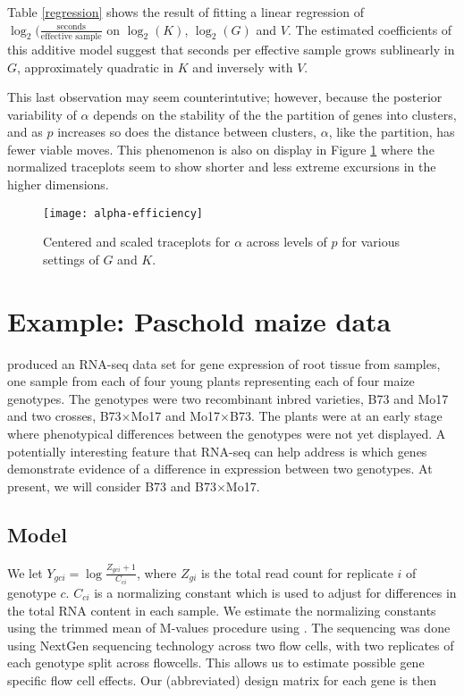 Table \ref{regression} shows the result of fitting a linear regression of $\log_2(\frac{\mbox{seconds}}{\mbox{effective sample}}$ on $\log_2(K)$, $\log_2(G)$ and $V$. The estimated coefficients of this additive model suggest that seconds per effective sample grows sublinearly in $G$, approximately quadratic in $K$ and inversely with $V$.

This last observation may seem counterintutive; however, because the posterior variability of $\alpha$ depends on the stability of the the partition of genes into clusters, and as $p$ increases so does the distance between clusters, $\alpha$, like the partition, has fewer viable moves. This phenomenon is also on display in Figure \ref{alpha-trace} where the normalized traceplots seem to show shorter and less extreme excursions in the higher dimensions.

\begin{figure}
\centering
\texttt{[image: alpha-efficiency]}
\caption{Centered and scaled traceplots for $\alpha$ across levels of $p$ for various settings of $G$ and $K$.}
\label{alpha-trace}
\end{figure}

\section{Example: Paschold maize data}
\citet{paschold} produced an RNA-seq data set for gene expression of root tissue from samples, one sample from each of four young plants representing each of four maize genotypes. The genotypes were two recombinant inbred varieties, B73 and Mo17 and two crosses, B73$\times$Mo17 and Mo17$\times$B73. The plants were at an early stage where phenotypical differences between the genotypes were not yet displayed. A potentially interesting feature that RNA-seq can help address is which genes demonstrate evidence of a difference in expression between two genotypes. At present, we will consider B73 and B73$\times$Mo17.

\subsection{Model}
We let $Y_{gci} = \log \frac{Z_{gci}+1}{C_{ci}}$, where $Z_{gi}$ is the total read count for replicate $i$ of genotype $c$. $C_{ci}$ is a normalizing constant which is used to adjust for differences in the total RNA content in each sample. We estimate the normalizing constants using the trimmed mean of M-values procedure \cite{robinson2010} using . The sequencing was done using NextGen sequencing technology across two flow cells, with two replicates of each genotype split across flowcells. This allows us to estimate possible gene specific flow cell effects. Our (abbreviated) design matrix for each gene is then

